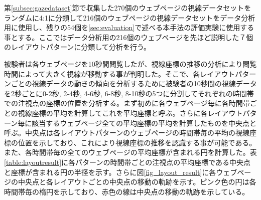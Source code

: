 \par 第\ref{subsec:gazedataset}節で収集した270個のウェブページの視線データセットをランダムに4:1に分類して216個のウェブページの視線データセットをデータ分析用に使用し、残りの54個を\ref{sec:evaluation}で述べる本手法の評価実験に使用する事とする。ここではデータ分析用の216個のウェブページを先ほど説明した７個のレイアウトパターンに分類して分析を行う。

\par 被験者は各ウェブページを10秒間閲覧したが、視線座標の推移の分析により閲覧時間によって大きく視線が移動する事が判明した。そこで、各レイアウトパターンごとの視線データの動きの傾向を分析するために被験者の10秒間の視線データを2秒ごとに0-2秒, 2-4秒, 4-6秒, 6-8秒, 8-10秒の5つに分割してそれぞれの時間帯での注視点の座標の位置を分析する。まず初めに各ウェブページ毎に各時間帯ごとの視線座標の平均を計算してこれを平均座標と呼ぶ。さらに各レイアウトパターン毎に該当するウェブページ全ての平均座標の平均を計算したものを中央点と呼ぶ。中央点は各レイアウトパターンのウェブページの時間帯毎の平均の視線座標の位置を示しており、これにより視線座標の推移を認識する事が可能である。また、各時間帯毎の全てのウェブページの平均座標が含まれる円を計算した。表\ref{table:layoutresult}に各パターンの時間帯ごとの注視点の平均座標である中央点と座標が含まれる円の半径を示す。さらに図\ref{fig_layout_result}に各ウェブページの中央点と各レイアウトごとの中央点の移動の軌跡を示す。ピンク色の円は各時間帯毎の楕円を示しており、赤色の線は中央点の移動の軌跡を示している。

